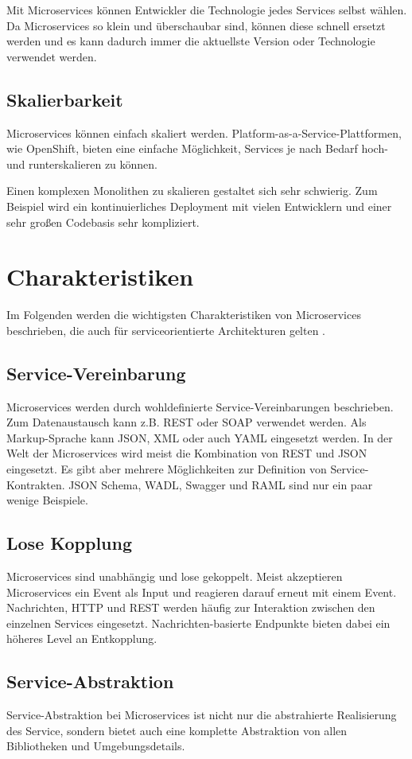 Mit Microservices können Entwickler die Technologie jedes Services selbst wählen. Da Microservices so klein und überschaubar sind, können diese schnell ersetzt werden und es kann dadurch immer die aktuellste Version oder Technologie verwendet werden.

\subsection{Skalierbarkeit}
Microservices können einfach skaliert werden. Platform-as-a-Service-Plattformen, wie OpenShift, bieten eine einfache Möglichkeit, Services je nach Bedarf hoch- und runterskalieren zu können.

Einen komplexen Monolithen zu skalieren gestaltet sich sehr schwierig. Zum Beispiel wird ein kontinuierliches Deployment mit vielen Entwicklern und einer sehr großen Codebasis sehr kompliziert.


\section{Charakteristiken}
Im Folgenden werden die wichtigsten Charakteristiken von Microservices beschrieben, die auch für serviceorientierte Architekturen gelten \cite{SpringMicroservices}.

\subsection{Service-Vereinbarung}
Microservices werden durch wohldefinierte Service-Vereinbarungen beschrieben. Zum Datenaustausch kann z.B. REST oder SOAP verwendet werden. Als Markup-Sprache kann JSON, XML oder auch YAML eingesetzt werden. In der Welt der Microservices wird meist die Kombination von REST und JSON eingesetzt. Es gibt aber mehrere Möglichkeiten zur Definition von Service-Kontrakten. JSON Schema, WADL, Swagger und RAML sind nur ein paar wenige Beispiele.

\subsection{Lose Kopplung}
Microservices sind unabhängig und lose gekoppelt. Meist akzeptieren Microservices ein Event als Input und reagieren darauf erneut mit einem Event. Nachrichten, HTTP und REST werden häufig zur Interaktion zwischen den einzelnen Services eingesetzt. Nachrichten-basierte Endpunkte bieten dabei ein höheres Level an Entkopplung.

\subsection{Service-Abstraktion}
Service-Abstraktion bei Microservices ist nicht nur die abstrahierte Realisierung des Service, sondern bietet auch eine komplette Abstraktion von allen Bibliotheken und Umgebungsdetails.

